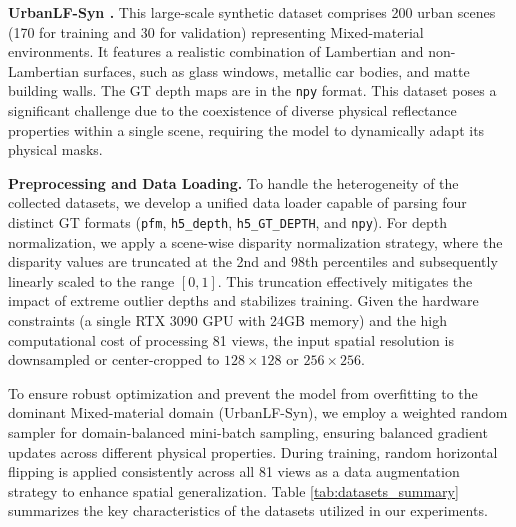 \documentclass[lettersize,journal]{IEEEtran}
\begin{document}
\textbf{UrbanLF-Syn .} This large-scale synthetic dataset comprises 200 urban scenes (170 for training and 30 for validation) representing Mixed-material environments. It features a realistic combination of Lambertian and non-Lambertian surfaces, such as glass windows, metallic car bodies, and matte building walls. The GT depth maps are in the \texttt{npy} format. This dataset poses a significant challenge due to the coexistence of diverse physical reflectance properties within a single scene, requiring the model to dynamically adapt its physical masks.

\textbf{Preprocessing and Data Loading.} To handle the heterogeneity of the collected datasets, we develop a unified data loader capable of parsing four distinct GT formats (\texttt{pfm}, \texttt{h5\_depth}, \texttt{h5\_GT\_DEPTH}, and \texttt{npy}). For depth normalization, we apply a scene-wise disparity normalization strategy, where the disparity values are truncated at the 2nd and 98th percentiles and subsequently linearly scaled to the range $[0, 1]$. This truncation effectively mitigates the impact of extreme outlier depths and stabilizes training. Given the hardware constraints (a single RTX 3090 GPU with 24GB memory) and the high computational cost of processing 81 views, the input spatial resolution is downsampled or center-cropped to $128 \times 128$ or $256 \times 256$. 

To ensure robust optimization and prevent the model from overfitting to the dominant Mixed-material domain (UrbanLF-Syn), we employ a weighted random sampler for domain-balanced mini-batch sampling, ensuring balanced gradient updates across different physical properties. During training, random horizontal flipping is applied consistently across all 81 views as a data augmentation strategy to enhance spatial generalization. Table \ref{tab:datasets_summary} summarizes the key characteristics of the datasets utilized in our experiments.
\end{document}
